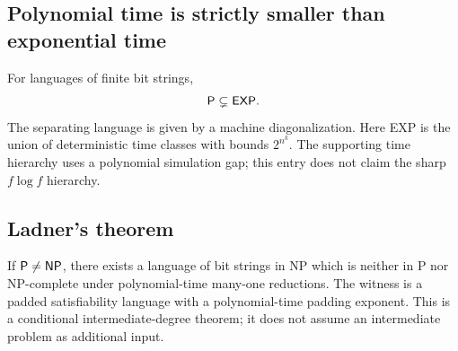 \begin{result}
\subsection{Polynomial time is strictly smaller than exponential time}
For languages of finite bit strings,
\[
\mathsf{P}\subsetneq\mathsf{EXP}.
\]
The separating language is given by a machine diagonalization. Here EXP is the
union of deterministic time classes with bounds $2^{n^k}$. The supporting time
hierarchy uses a polynomial simulation gap; this entry does not claim the sharp
$f\log f$ hierarchy.\citep[Chapter 3]{AroraBarak09}
\end{result}

\begin{result}
\subsection{Ladner's theorem}
If $\mathsf{P}\ne\mathsf{NP}$, there exists a language of bit strings in NP which is
neither in P nor NP-complete under polynomial-time many-one reductions.
The witness is a padded satisfiability language with a polynomial-time padding
exponent. This is a conditional intermediate-degree theorem; it does not assume
an intermediate problem as additional input.\citep[Theorem 3.3]{AroraBarak09}
\end{result}

